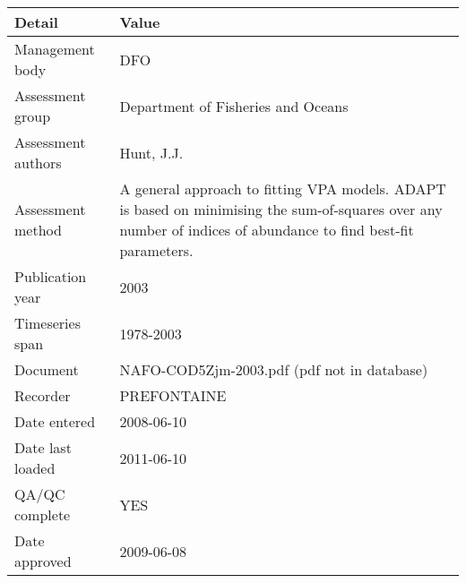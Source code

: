 \begin{table}[htb]
\centering
\begin{tabular}{lp{7cm}}
\toprule
Detail & Value \\
\midrule
Management body    & DFO                                                                                                                                                            \\
Assessment group   & Department of Fisheries and Oceans                                                                                                                             \\
Assessment authors & Hunt, J.J.                                                                                                                                                     \\
Assessment method  & A general approach to fitting VPA models. ADAPT is based on minimising the sum-of-squares over any number of indices of abundance to find best-fit parameters. \\
Publication year   & 2003                                                                                                                                                           \\
Timeseries span    & 1978-2003                                                                                                                                                      \\
Document           & NAFO-COD5Zjm-2003.pdf (pdf not in database)                                                                                                                    \\
Recorder           & PREFONTAINE                                                                                                                                                    \\
Date entered       & 2008-06-10                                                                                                                                                     \\
Date last loaded   & 2011-06-10                                                                                                                                                     \\
QA/QC complete     & YES                                                                                                                                                            \\
Date approved      & 2009-06-08                                                                                                                                                     \\
\bottomrule
\end{tabular}
\label{tab:assessdet}
\end{table}
